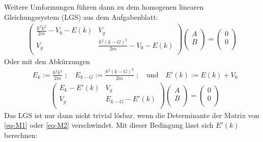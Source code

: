 Weitere Umformungen führen dann zu dem homogenen linearen Gleichungssystem (LGS)
aus dem Aufgabenblatt:
\begin{align}
\label{eq-M1}
\begin{pmatrix}
\frac{\hbar^2k^2}{2m}-V_0-E(k) & V_g\\
V_g & \frac{\hbar^2(k-G)^2}{2m}-V_0-E(k)\\
\end{pmatrix}
\begin{pmatrix}
A\\ B\\
\end{pmatrix}
= \begin{pmatrix}
0\\ 0\\
\end{pmatrix}
\end{align}
Oder mit den Abkürzungen
\begin{align*}
& E_{k} := \frac{\hbar^2k^2}{2m}\; ; \quad E_{k-G} := \frac{\hbar^2(k-G)^2}{2m}\; ;
\quad \text{und}\quad E'(k) := E(k)+V_0
\end{align*}
\begin{align}
&\begin{pmatrix}
\label{eq-M2}
E_k-E'(k) & V_g\\
V_g & E_{k-G}-E'(k)\\
\end{pmatrix}
\begin{pmatrix}
A\\ B\\
\end{pmatrix}
= \begin{pmatrix}
0\\ 0\\
\end{pmatrix}
\end{align}
Das LGS ist nur dann nicht trivial lösbar, wenn die Determinante der Matrix
von \eqref{eq-M1} oder \eqref{eq-M2} verschwindet. Mit dieser Bedingung lässt
sich $E'(k)$ berechnen:

